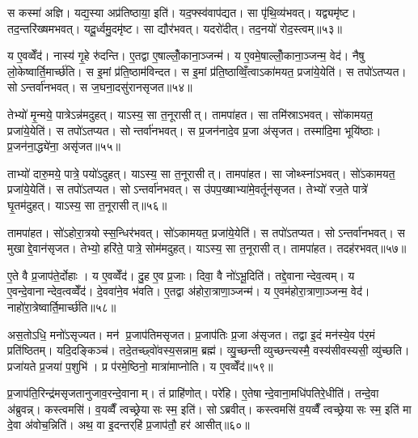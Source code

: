 स कस्मा॑ अज्ञि। यद्य॒स्या अप्र॑तिष्ठाया॒ इति॑। यद॒फ्स्व॑वाप॑द्यत। सा पृ॑थि॒व्य॑भवत्। यद्व्यमृ॑ष्ट। तद॒न्तरि॑ख्षमभवत्। यदू॒र्ध्वमु॒दमृ॑ष्ट। सा द्यौर॑भवत्। यदरो॑दीत्। तद॒नयो॑ रोद॒स्त्वम्॥५३॥

य ए॒वव्वेँद॑। नास्य॑ गृ॒हे रु॑दन्ति। ए॒तद्वा ए॒षाल्लोँ॒काना॒ञ्जन्म॑। य ए॒वमे॒षाल्लोँ॒काना॒ञ्जन्म॒ वेद॑। नैषु लो॒केष्वार्ति॒मार्च्छ॑ति। स इ॒मां प्र॑ति॒ष्ठाम॑विन्दत। स इ॒मां प्र॑ति॒ष्ठाव्विँ॒त्वाऽका॑मयत॒ प्रजा॑ये॒येति॑। स तपो॑ऽतप्यत। सोऽन्तर्वा॑नभवत्। स ज॒घना॒दसु॑रानसृजत॥५४॥

तेभ्यो॑ मृ॒न्मये॒ पात्रेऽन्न॑मदुहत्। याऽस्य॒ सा त॒नूरासीत्। तामपा॑हत। सा तमि॑स्राऽभवत्। सो॑कामयत॒ प्रजा॑ये॒येति॑। स तपो॑ऽतप्यत। सोन्तर्वा॑नभवत्। स प्र॒जन॑नादे॒व प्र॒जा अ॑सृजत। तस्मा॑दि॒मा भूयि॑ष्ठाः। प्र॒जन॑ना॒द्ध्ये॑ना॒ असृ॑जत॥५५॥

ताभ्यो॑ दारु॒मये॒ पात्रे॒ पयो॑ऽदुहत्। याऽस्य॒ सा त॒नूरासीत्। तामपा॑हत। सा जोथ्स्ना॑ऽभवत्। सो॑ऽकामयत॒ प्रजा॑ये॒येति॑। स तपो॑ऽतप्यत। सोऽन्तर्वा॑नभवत्। स उ॑पप॒ख्षाभ्या॑मे॒वर्तून॑सृजत। तेभ्यो॑ रज॒ते पात्रे॑ घृ॒तम॑दुहत्। याऽस्य॒ सा त॒नूरासीत्॥५६॥

तामपा॑हत। सो॑ऽहोरा॒त्रयोस्स॒न्धिर॑भवत्। सो॑ऽकामयत॒ प्रजा॑ये॒येति॑। स तपो॑ऽतप्यत। सोऽन्तर्वा॑नभवत्। स मुखाद्दे॒वान॑सृजत। तेभ्यो॒ हरि॑ते॒ पात्रे॒ सोम॑मदुहत्। याऽस्य॒ सा त॒नूरासीत्। तामपा॑हत। तदह॑रभवत्॥५७॥

ए॒ते वै प्र॒जाप॑ते॒र्दोहाः। य ए॒वव्वेँद॑। दु॒ह ए॒व प्र॒जाः। दिवा॒ वै नो॑ऽभू॒दिति॑। तद्दे॒वानान्देव॒त्वम्। य ए॒वन्दे॒वानान्देव॒त्वव्वेँद॑। दे॒ववा॑ने॒व भ॑वति। ए॒तद्वा अ॑होरा॒त्राणा॒ञ्जन्म॑। य ए॒वम॑होरा॒त्राणा॒ञ्जन्म॒ वेद॑। नाहो॑रा॒त्रेष्वार्ति॒मार्च्छ॑ति॥५८॥

अस॒तोऽधि॒ मनो॑ऽसृज्यत। मन॑ प्र॒जाप॑तिमसृजत। प्र॒जाप॑तिः प्र॒जा अ॑सृजत। तद्वा इ॒दं मन॑स्ये॒व प॑र॒मं प्रति॑ष्ठितम्। यदि॒दङ्किञ्च॑। तदे॒तच्छ्वो॑वस्य॒सन्नाम॒ ब्रह्म॑। व्यु॒च्छन्तीव्युच्छन्त्यस्मै॒ वस्य॑सीवस्यसी॒ व्यु॑च्छति। प्रजा॑यते प्र॒जया॑ प॒शुभि॑। प्र प॑रमे॒ष्ठिनो॒ मात्रा॑माप्नोति। य ए॒वव्वेँद॑॥५९॥

प्र॒जाप॑ति॒रिन्द्र॑मसृजतानुजाव॒रन्दे॒वानाम्। तं प्राहि॑णोत्। परे॑हि। ए॒तेषान्दे॒वाना॒मधि॑पतिरे॒धीति॑। तन्दे॒वा अ॑ब्रुवन्न्। कस्त्वमसि॑। व॒यव्वैँ त्वच्छ्रेयासः स्म॒ इति॑। सोऽब्रवीत्। कस्त्वमसि॑ व॒यव्वैँ त्वच्छ्रेयासः स्म॒ इति॑ मा दे॒वा अ॑वोच॒न्निति॑। अथ॒ वा इ॒दन्तर्‌हि॑ प्र॒जाप॑तौ॒ हर॑ आसीत्॥६०॥

